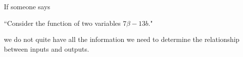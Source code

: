 \begin{center}
\href{https://www.youtube.com/watch?v=dvoG5P9Uczg}{\takeone} \hspace{1cm}
\end{center}
If someone says 
\vspace{-.01cm}
\begin{center}
``Consider the function of two variables $7\beta-13 b$." 
\end{center}
we do not quite have all the information we need to determine the relationship between inputs and outputs. 
